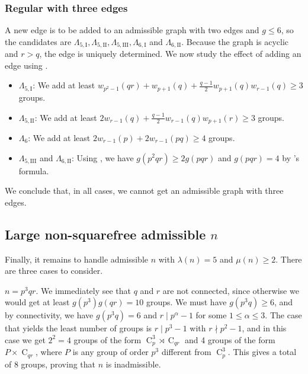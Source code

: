 \documentclass{article}
\newcommand{\cyc}[1]{\operatorname{C}_{#1}}
\newcommand{\qlame}{\Lambda_{5,\text{I}}}
\newcommand{\qlamz}{\Lambda_{5,\text{II}}}
\newcommand{\qlamd}{\Lambda_{5,\text{III}}}
\newcommand{\slame}{\Lambda_{6, \text{I}}}
\newcommand{\slamz}{\Lambda_{6, \text{II}}}
\newcommand{\m}[1]{\text{M}_{#1}}
\newcommand{\hthref}[1]{\hyperref[#1]{\thref{#1}}}
\theoremstyle{plain}
\theoremstyle{definition}
\begin{document}
\subsubsection*{Regular  with three edges}
A new edge is to be added to an admissible graph with two edges and $g \le 6$, so the candidates are $\qlame, \qlamz, \qlamd, \slame$ and $\slamz$. Because the graph is acyclic and $r > q$, the edge is uniquely determined. We now study the effect of adding an edge using \hthref{euppqr}.
\begin{itemize}
	\item $\qlame$: We add at least $w_{p^2 - 1}(qr) + w_{p + 1}(q) + \frac{q - 1}{2}w_{p + 1}(q)w_{r - 1}(q) \ge 3$ groups.
	\item $\qlamz$: We add at least $2w_{r - 1}(q) + \frac{q - 1}{2} w_{r - 1}(q)w_{p + 1}(r) \ge 3$ groups.
	\item $\Lambda_6$: We add at least $2w_{r - 1}(p) + 2w_{r - 1}(pq) \ge 4$ groups.
	\item $\qlamd$ and $\slamz$: Using \hthref{eubold}, we have $g(p^2 q r) \ge 2g(pqr)$ and $g(pqr) = 4$ by 's formula.
\end{itemize} \nopagebreak[4]
We conclude that, in all cases, we cannot get an admissible graph with three edges.


\subsection{Large non-squarefree admissible $n$} 
Finally, it remains to handle admissible $n$ with $\lambda(n) = 5$ and $\mu(n) \ge 2$. There are three cases to consider.

 $n = p^3 q r$.
We immediately see that $q$ and $r$ are not connected, since otherwise we would get at least $g(p^3)g(qr) = 10$ groups. We must have $g(p^3 q) \ge 6$, and by connectivity, we have $g(p^3 q) = 6$ and $r \mid p^\alpha - 1$ for some $1 \le \alpha \le 3$. The case that yields the least number of groups is $r \mid p^3 - 1$ with $r \nmid p^2 - 1$, and in this case we get $2^2 = 4$ groups of the form $\cyc{p}^3 \rtimes \cyc{qr}$ and 4 groups of the form $P \times \cyc{qr}$, where $P$ is any group of order $p^3$ different from $\cyc{p}^3$. This gives a total of 8 groups, proving that $n$ is inadmissible.
\end{document}
